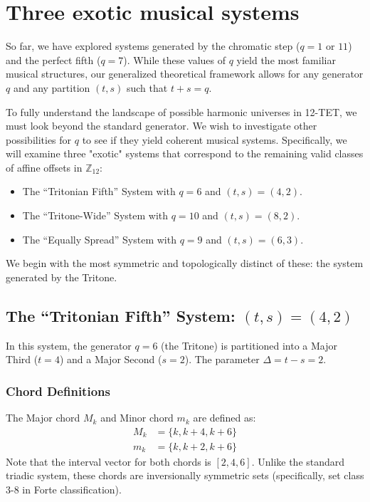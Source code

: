 \documentclass[12pt,letterpaper]{amsart}
\begin{document}
\section{Three exotic musical systems}

So far, we have explored systems generated by the chromatic step ($q=1$ or $11$) and the perfect fifth ($q=7$). While these values of $q$ yield the most familiar musical structures, our generalized theoretical framework allows for any generator $q$ and any partition $(t,s)$ such that $t+s=q$.

To fully understand the landscape of possible harmonic universes in 12-TET, we must look beyond the standard generator. We wish to investigate other possibilities for $q$ to see if they yield coherent musical systems. Specifically, we will examine three "exotic" systems that correspond to the remaining valid classes of affine offsets in $\mathbb{Z}_{12}$:
\begin{itemize}
    \item The ``Tritonian Fifth'' System with $q=6$ and $(t,s)=(4,2)$.
    \item The ``Tritone-Wide'' System with $q=10$ and $(t,s)=(8,2)$.
    \item The ``Equally Spread'' System with $q=9$ and  $(t,s)=(6,3)$.
\end{itemize}

We begin with the most symmetric and topologically distinct of these: the system generated by the Tritone.

\subsection{The ``Tritonian Fifth'' System: \texorpdfstring{$(t,s)=(4,2)$}{t=4, s=2}}
In this system, the generator $q=6$ (the Tritone) is partitioned into a Major Third ($t=4$) and a Major Second ($s=2$). The parameter $\Delta = t-s = 2$.

\subsubsection{Chord Definitions}
The Major chord $M_k$ and Minor chord $m_k$ are defined as:
\begin{align}
    M_k &= \{k, k+4, k+6\} \\
    m_k &= \{k, k+2, k+6\}
\end{align}
Note that the interval vector for both chords is $[2, 4, 6]$. Unlike the standard triadic system, these chords are inversionally symmetric sets (specifically, set class 3-8 in Forte classification).
\end{document}
